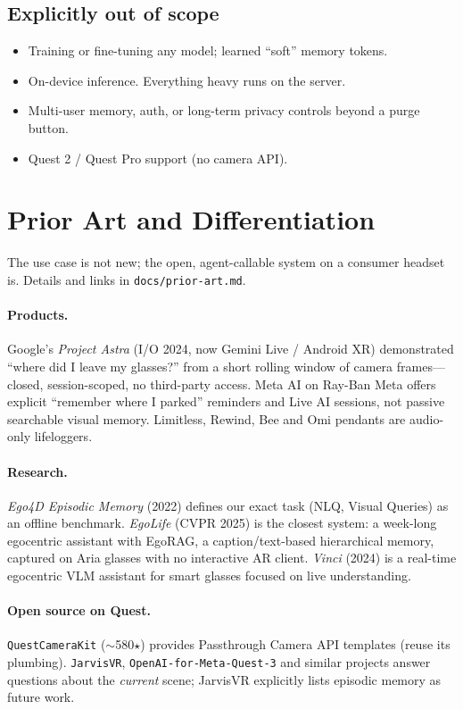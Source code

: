 \documentclass[11pt,a4paper]{article}
\begin{document}
\subsection{Explicitly out of scope}
\begin{itemize}
  \item Training or fine-tuning any model; learned ``soft'' memory tokens.
  \item On-device inference. Everything heavy runs on the server.
  \item Multi-user memory, auth, or long-term privacy controls beyond a purge button.
  \item Quest 2 / Quest Pro support (no camera API).
\end{itemize}

\section{Prior Art and Differentiation}
The use case is not new; the open, agent-callable system on a consumer headset is. Details and links in \texttt{docs/prior-art.md}.

\paragraph{Products.} Google's \emph{Project Astra} (I/O 2024, now Gemini Live / Android XR) demonstrated ``where did I leave my glasses?'' from a short rolling window of camera frames---closed, session-scoped, no third-party access. Meta AI on Ray-Ban Meta offers explicit ``remember where I parked'' reminders and Live AI sessions, not passive searchable visual memory. Limitless, Rewind, Bee and Omi pendants are audio-only lifeloggers.

\paragraph{Research.} \emph{Ego4D Episodic Memory} (2022) defines our exact task (NLQ, Visual Queries) as an offline benchmark. \emph{EgoLife} (CVPR 2025) is the closest system: a week-long egocentric assistant with EgoRAG, a caption/text-based hierarchical memory, captured on Aria glasses with no interactive AR client. \emph{Vinci} (2024) is a real-time egocentric VLM assistant for smart glasses focused on live understanding.

\paragraph{Open source on Quest.} \texttt{QuestCameraKit} ($\sim$580$\star$) provides Passthrough Camera API templates (reuse its plumbing). \texttt{JarvisVR}, \texttt{OpenAI-for-Meta-Quest-3} and similar projects answer questions about the \emph{current} scene; JarvisVR explicitly lists episodic memory as future work.
\end{document}
